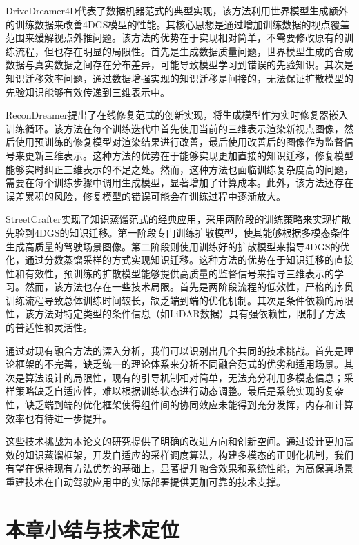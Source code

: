 DriveDreamer4D代表了数据机器范式的典型实现，该方法利用世界模型生成额外的训练数据来改善4DGS模型的性能\cite{drivedreamer4d2024}。其核心思想是通过增加训练数据的视点覆盖范围来缓解视点外推问题。该方法的优势在于实现相对简单，不需要修改原有的训练流程，但也存在明显的局限性。首先是生成数据质量问题，世界模型生成的合成数据与真实数据之间存在分布差异，可能导致模型学习到错误的先验知识。其次是知识迁移效率问题，通过数据增强实现的知识迁移是间接的，无法保证扩散模型的先验知识能够有效传递到三维表示中。

ReconDreamer提出了在线修复范式的创新实现，将生成模型作为实时修复器嵌入训练循环\cite{recondreamer2024}。该方法在每个训练迭代中首先使用当前的三维表示渲染新视点图像，然后使用预训练的修复模型对渲染结果进行改善，最后使用改善后的图像作为监督信号来更新三维表示。这种方法的优势在于能够实现更加直接的知识迁移，修复模型能够实时纠正三维表示的不足之处。然而，这种方法也面临训练复杂度高的问题，需要在每个训练步骤中调用生成模型，显著增加了计算成本。此外，该方法还存在误差累积的风险，修复模型的错误可能会在训练过程中逐渐放大。

StreetCrafter实现了知识蒸馏范式的经典应用，采用两阶段的训练策略来实现扩散先验到4DGS的知识迁移\cite{yan2025streetcrafter}。第一阶段专门训练扩散模型，使其能够根据多模态条件生成高质量的驾驶场景图像。第二阶段则使用训练好的扩散模型来指导4DGS的优化，通过分数蒸馏采样的方式实现知识迁移。这种方法的优势在于知识迁移的直接性和有效性，预训练的扩散模型能够提供高质量的监督信号来指导三维表示的学习。然而，该方法也存在一些技术局限。首先是两阶段流程的低效性，严格的序贯训练流程导致总体训练时间较长，缺乏端到端的优化机制。其次是条件依赖的局限性，该方法对特定类型的条件信息（如LiDAR数据）具有强依赖性，限制了方法的普适性和灵活性。

通过对现有融合方法的深入分析，我们可以识别出几个共同的技术挑战。首先是理论框架的不完善，缺乏统一的理论体系来分析不同融合范式的优劣和适用场景。其次是算法设计的局限性，现有的引导机制相对简单，无法充分利用多模态信息；采样策略缺乏自适应性，难以根据训练状态进行动态调整。最后是系统实现的复杂性，缺乏端到端的优化框架使得组件间的协同效应未能得到充分发挥，内存和计算效率也有待进一步提升。

这些技术挑战为本论文的研究提供了明确的改进方向和创新空间。通过设计更加高效的知识蒸馏框架，开发自适应的采样调度算法，构建多模态的正则化机制，我们有望在保持现有方法优势的基础上，显著提升融合效果和系统性能，为高保真场景重建技术在自动驾驶应用中的实际部署提供更加可靠的技术支撑。

\section{本章小结与技术定位}

